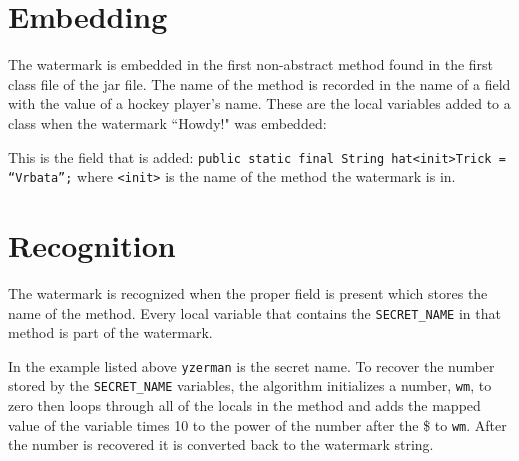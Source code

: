 \section{Embedding}
The watermark is embedded in the first non-abstract method found in 
the first class file
of the jar file. The name of the method is recorded in the name of a field with
the value of a hockey player's name. These are the local variables added to
a class when the watermark ``Howdy!" was embedded:
This is the field that is added:
\texttt{public static final String hat<init>Trick = ``Vrbata'';}
where \texttt{<init>} is the name of the method the watermark is in.

\section{Recognition}
The watermark is recognized when the proper field is present which stores the
name of the method. Every local variable that contains the \texttt{SECRET\_NAME}
in that method is part of the watermark.

In the example listed above \texttt{yzerman} is the secret name. To recover the
number stored by the \texttt{SECRET\_NAME} variables, the algorithm initializes
a number, \texttt{wm}, to zero then loops 
through all of the locals in the method and adds the mapped value of the
variable times 10 to the power of the number after the \$ to \texttt{wm}.
After the number is recovered it is converted back to the watermark string.

